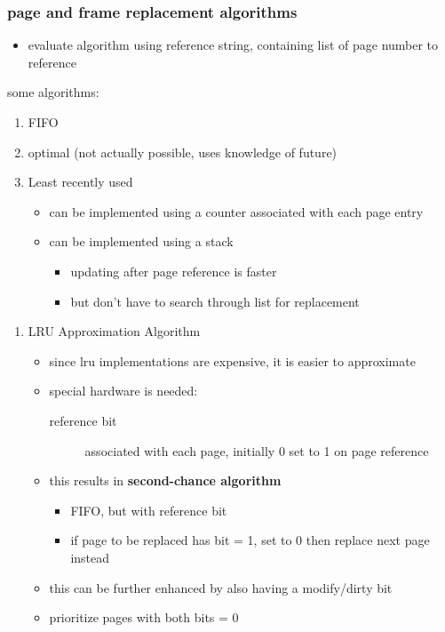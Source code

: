 \documentclass[11pt]{article}
\begin{document}
\subsubsection{page and frame replacement algorithms}
\label{sec:orged6c4bd}
\begin{itemize}
\item evaluate algorithm using reference string, containing list of page number to reference
\end{itemize}
some algorithms:
\begin{enumerate}
\item FIFO
\item optimal (not actually possible, uses knowledge of future)
\item Least recently used
\begin{itemize}
\item can be implemented using a counter associated with each page entry
\item can be implemented using a stack
\begin{itemize}
\item updating after page reference is faster
\item but don't have to search through list for replacement
\end{itemize}
\end{itemize}
\end{enumerate}
\begin{enumerate}
\item LRU Approximation Algorithm
\label{sec:orgc16ef0c}
\begin{itemize}
\item since lru implementations are expensive, it is easier to approximate
\item special hardware is needed:
\begin{description}
\item[{reference bit}] associated with each page, initially 0 set to 1 on page reference
\end{description}
\item this results in \textbf{second-chance algorithm}
\begin{itemize}
\item FIFO, but with reference bit
\item if page to be replaced has bit = 1, set to 0 then replace next page instead
\end{itemize}
\item this can be further enhanced by also having a modify/dirty bit
\item prioritize pages with both bits = 0
\end{itemize}
\end{enumerate}
\end{document}

